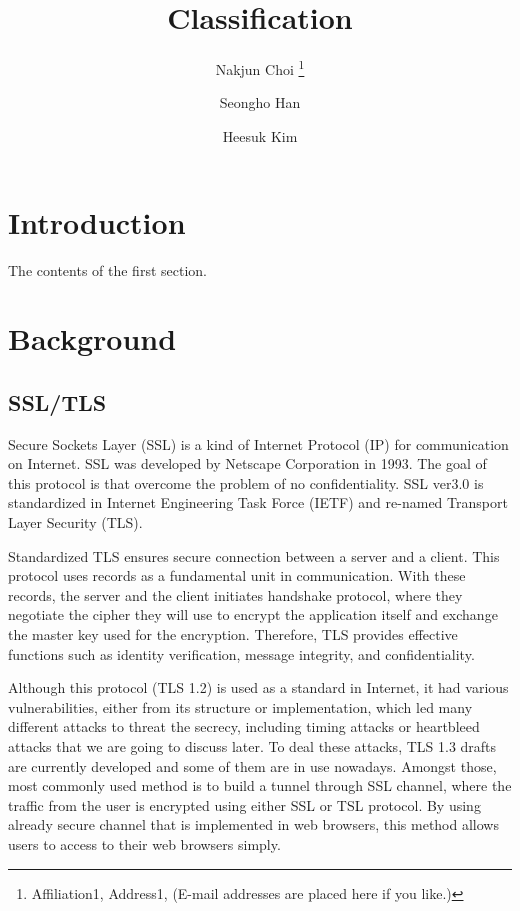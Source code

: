 \documentclass[a4paper]{article}
\begin{document}
\title{
  Classification    %
}

\author{
  Nakjun Choi%
  \thanks{
    Affiliation1, Address1,   %
    (E-mail addresses are placed here if you like.)
  }
  \and
  Seongho Han
  \and
  Heesuk Kim
}

\maketitle

\section{Introduction}

The contents of the first section.

\section{Background}
\subsection{SSL/TLS}
Secure Sockets Layer (SSL) is a kind of Internet Protocol (IP) for communication on Internet. SSL was developed by Netscape Corporation in 1993. The goal of this protocol is that overcome the problem of no confidentiality. SSL ver3.0 is standardized in Internet Engineering Task Force (IETF) and re-named Transport Layer Security (TLS).

Standardized TLS \cite{TLS1, TLS2} ensures secure connection between a server and a client. This protocol uses records as a fundamental unit in communication. With these records, the server and the client initiates handshake protocol, where they negotiate the cipher they will use to encrypt the application itself and exchange the master key used for the encryption. Therefore, TLS provides effective functions such as identity verification, message integrity, and confidentiality.

Although this protocol (TLS 1.2) is used as a standard in Internet, it had various vulnerabilities, either from its structure or implementation, which led many different attacks to threat the secrecy, including timing attacks or heartbleed attacks that we are going to discuss later. To deal these attacks, TLS 1.3 drafts are currently developed and some of them are in use nowadays. Amongst those, most commonly used method is to build a tunnel through SSL channel, where the traffic from the user is encrypted using either SSL or TSL protocol. By using already secure channel that is implemented in web browsers, this method allows users to access to their web browsers simply.
\end{document}
